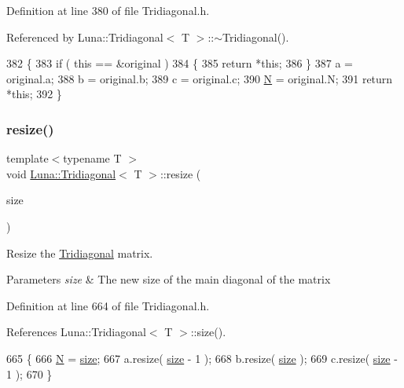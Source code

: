 Definition at line 380 of file Tridiagonal.\+h.



Referenced by Luna\+::\+Tridiagonal$<$ T $>$\+::$\sim$\+Tridiagonal().


\begin{DoxyCode}
382   \{
383     \textcolor{keywordflow}{if} ( \textcolor{keyword}{this} == &original )
384     \{
385       \textcolor{keywordflow}{return} *\textcolor{keyword}{this};
386     \}
387     a = original.a;
388     b = original.b;
389     c = original.c;
390     \hyperlink{namespaceHeat__plot_a7d050092798e28458a263710837bda77}{N} = original.N;
391     \textcolor{keywordflow}{return} *\textcolor{keyword}{this};
392   \}
\end{DoxyCode}
\mbox{\label{classLuna_1_1Tridiagonal_aafeede93e34d8418725ae97c645e54cc}} 
\subsubsection{\texorpdfstring{resize()}{resize()}}
{\footnotesize\ttfamily template$<$typename T $>$ \\
void \hyperlink{classLuna_1_1Tridiagonal}{Luna\+::\+Tridiagonal}$<$ T $>$\+::resize (\begin{DoxyParamCaption}\item[{const std\+::size\+\_\+t \&}]{size }\end{DoxyParamCaption})\hspace{0.3cm}{\ttfamily [inline]}}



Resize the \hyperlink{classLuna_1_1Tridiagonal}{Tridiagonal} matrix. 


\begin{DoxyParams}{Parameters}
{\em size} & The new size of the main diagonal of the matrix \\
\hline
\end{DoxyParams}


Definition at line 664 of file Tridiagonal.\+h.



References Luna\+::\+Tridiagonal$<$ T $>$\+::size().


\begin{DoxyCode}
665   \{
666     \hyperlink{namespaceHeat__plot_a7d050092798e28458a263710837bda77}{N} = \hyperlink{classLuna_1_1Tridiagonal_ae8586e82968a8c28f7c50008e1f75411}{size};
667     a.resize( \hyperlink{classLuna_1_1Tridiagonal_ae8586e82968a8c28f7c50008e1f75411}{size} - 1 );
668     b.resize( \hyperlink{classLuna_1_1Tridiagonal_ae8586e82968a8c28f7c50008e1f75411}{size} );
669     c.resize( \hyperlink{classLuna_1_1Tridiagonal_ae8586e82968a8c28f7c50008e1f75411}{size} - 1 );
670   \}
\end{DoxyCode}
\mbox{\label{classLuna_1_1Tridiagonal_a6594e3223659a5e9c7b911cda11ec5b3}} 
